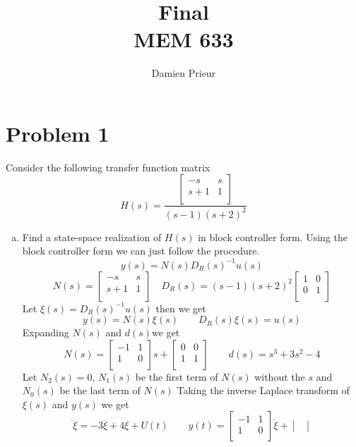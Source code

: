 \documentclass{article}
\author{Damien Prieur}
\title{Final \\ MEM 633}
\date{}
\begin{document}
\maketitle

\section*{Problem 1}
Consider the following transfer function matrix
$$
H(s) = \frac{
    \begin{bmatrix}
        -s & s \\
        s+1 & 1 \\
    \end{bmatrix}
}{(s-1)(s+2)^2}
$$
\begin{enumerate}[(a)]
\item Find a state-space realization of $H(s)$ in block controller form.
\newline
Using the block controller form we can just follow the procedure.
$$ y(s) = N(s) D_R(s)^{-1}u(s) $$
$$
N(s) =
\begin{bmatrix}
-s & s \\
s+1 & 1 \\
\end{bmatrix}
\quad
D_R(s) =
(s-1)(s+2)^2
\begin{bmatrix}
1 & 0 \\
0 & 1 \\
\end{bmatrix}
$$
Let $\xi(s) = D_R(s)^{-1}u(s)$ then we get
$$ y(s) = N(s) \xi(s) \qquad D_R(s)\xi(s) = u(s) $$
Expanding $N(s)$ and $d(s)$we get
$$
N(s) =
\begin{bmatrix}
-1 & 1 \\
1 & 0 \\
\end{bmatrix}
s
+
\begin{bmatrix}
0 & 0 \\
1 & 1 \\
\end{bmatrix}
\qquad
d(s) = s^3 + 3s^2 - 4
$$
Let $N_2(s) = 0$, $N_1(s)$ be the first term of $N(s)$ without the $s$ and $N_0(s)$ be the last term of $N(s)$
\newline
Taking the inverse Laplace transform of $\xi(s)$ and $y(s)$ we get
$$
\dddot{\xi} =  - 3 \ddot{\xi} + 4\xi + U(t)
\qquad
y(t) =
\begin{bmatrix}
-1 & 1 \\
1 & 0 \\
\end{bmatrix}
\dot{\xi}
+
\begin{bmatrix}

\end{bmatrix}$$
\end{enumerate}
\end{document}
